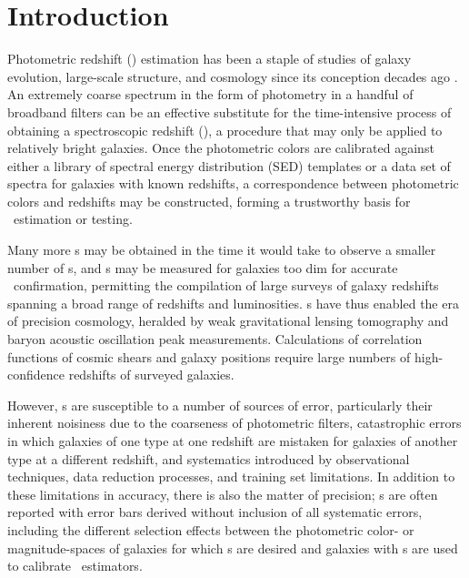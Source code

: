 \chapter*{Introduction}


Photometric redshift (\pz) estimation has been a staple of studies of galaxy evolution, large-scale structure, and cosmology since its conception decades ago \citep{Baum1962}.  
An extremely coarse spectrum in the form of photometry in a handful of broadband filters can be an effective substitute for the time-intensive process of obtaining a spectroscopic redshift (\sz), a procedure that may only be applied to relatively bright galaxies.  
Once the photometric colors are calibrated against either a library of spectral energy distribution (SED) templates or a data set of spectra for galaxies with known redshifts, a correspondence between photometric colors and redshifts may be constructed, forming a trustworthy basis for \pz\ estimation or testing.

Many more \pz s may be obtained in the time it would take to observe a smaller number of \sz s, and \pz s may be measured for galaxies too dim for accurate \sz\ confirmation, permitting the compilation of large surveys of galaxy redshifts spanning a broad range of redshifts and luminosities.  
\Pz s have thus enabled the era of precision cosmology, heralded by weak gravitational lensing tomography and baryon acoustic oscillation peak measurements.  
Calculations of correlation functions of cosmic shears and galaxy positions require large numbers of high-confidence redshifts of surveyed galaxies.  

However, \pz s are susceptible to a number of sources of error, particularly their inherent noisiness due to the coarseness of photometric filters, catastrophic errors in which galaxies of one type at one redshift are mistaken for galaxies of another type at a different redshift, and systematics introduced by observational techniques, data reduction processes, and training set limitations.  
In addition to these limitations in accuracy, there is also the matter of precision; \pz s are often reported with error bars derived without inclusion of all systematic errors, including the different selection effects between the photometric color- or magnitude-spaces of galaxies for which \pz s are desired and galaxies with \sz s are used to calibrate \pz\ estimators.

